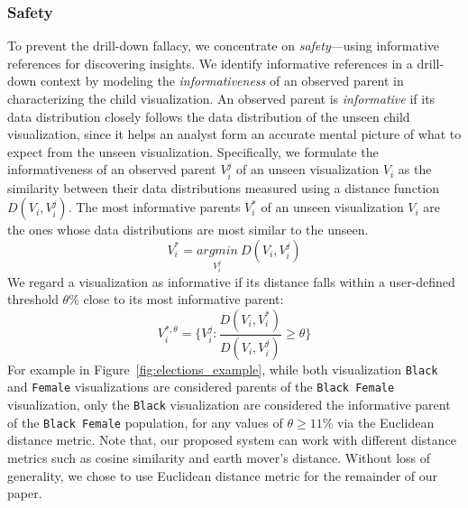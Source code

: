 \subsubsection{Safety}
To prevent the drill-down fallacy, we concentrate on \emph{safety}---using informative references for discovering insights. We identify informative references in a drill-down context by modeling the \emph{informativeness} of an observed parent in characterizing the child visualization. An observed parent is \emph{informative} if its data distribution closely follows the data distribution of the unseen child visualization, since it helps an analyst form an accurate mental picture of what to expect from the unseen visualization. Specifically, we formulate the informativeness of an observed parent $V_i^j$ of an unseen visualization $V_i$ as the similarity between their data distributions measured using a distance function $D(V_i, V_i^j)$. The most informative parents $V_i^*$ of an unseen visualization $V_i$ are the ones whose data distributions are most similar to the unseen.
\begin{equation}
    V_i^*=\underset{V_i^j}{argmin}\ D(V_i, V_i^j)
\end{equation}
We regard a visualization as informative if its distance falls within a user-defined threshold $\theta\%$ close to its most informative parent:
\begin{equation}
    V_i^{*, \theta} = \{V_i^j : \frac{D(V_i, V_i^*)}{D(V_i, V_i^j)} \geq \theta\}
\end{equation}
For example in Figure~\ref{fig:elections_example}, while both visualization \texttt{Black} and \texttt{Female} visualizations are considered parents of the \texttt{Black Female} visualization, only the \texttt{Black} visualization are considered the informative parent of the \texttt{Black Female} population, for any values of $\theta \geq 11\%$ via the Euclidean distance metric. Note that, our proposed system can work with different distance metrics such as cosine similarity and earth mover's distance. Without loss of generality, we chose to use Euclidean distance metric for the remainder of our paper.

